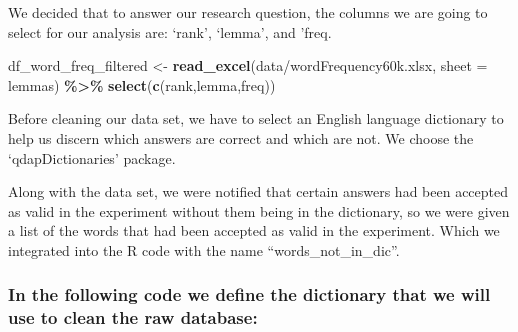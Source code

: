 \documentclass[
]{article}
\newenvironment{Shaded}{\begin{snugshade}}{\end{snugshade}}
\newcommand{\AttributeTok}[1]{\textcolor[rgb]{0.13,0.29,0.53}{#1}}
\newcommand{\FunctionTok}[1]{\textcolor[rgb]{0.13,0.29,0.53}{\textbf{#1}}}
\newcommand{\NormalTok}[1]{#1}
\newcommand{\OtherTok}[1]{\textcolor[rgb]{0.56,0.35,0.01}{#1}}
\newcommand{\SpecialCharTok}[1]{\textcolor[rgb]{0.81,0.36,0.00}{\textbf{#1}}}
\newcommand{\StringTok}[1]{\textcolor[rgb]{0.31,0.60,0.02}{#1}}
\begin{document}
We decided that to answer our research question, the columns we are
going to select for our analysis are: `rank', `lemma', and 'freq.

\begin{Shaded}
\begin{Highlighting}[]
\NormalTok{df\_word\_freq\_filtered }\OtherTok{\textless{}{-}} \FunctionTok{read\_excel}\NormalTok{(}\StringTok{\textquotesingle{}data/wordFrequency60k.xlsx\textquotesingle{}}\NormalTok{, }
                           \AttributeTok{sheet =} \StringTok{\textquotesingle{}lemmas\textquotesingle{}}\NormalTok{)  }\SpecialCharTok{\%\textgreater{}\%} 
  \FunctionTok{select}\NormalTok{(}\FunctionTok{c}\NormalTok{(}\StringTok{\textquotesingle{}rank\textquotesingle{}}\NormalTok{,}\StringTok{\textquotesingle{}lemma\textquotesingle{}}\NormalTok{,}\StringTok{\textquotesingle{}freq\textquotesingle{}}\NormalTok{))}
\end{Highlighting}
\end{Shaded}

Before cleaning our data set, we have to select an English language
dictionary to help us discern which answers are correct and which are
not. We choose the `qdapDictionaries' package.

Along with the data set, we were notified that certain answers had been
accepted as valid in the experiment without them being in the
dictionary, so we were given a list of the words that had been accepted
as valid in the experiment. Which we integrated into the R code with the
name ``words\_not\_in\_dic''.

\hypertarget{in-the-following-code-we-define-the-dictionary-that-we-will-use-to-clean-the-raw-database}{%
\subsubsection{In the following code we define the dictionary that we
will use to clean the raw
database:}\label{in-the-following-code-we-define-the-dictionary-that-we-will-use-to-clean-the-raw-database}}
\end{document}
